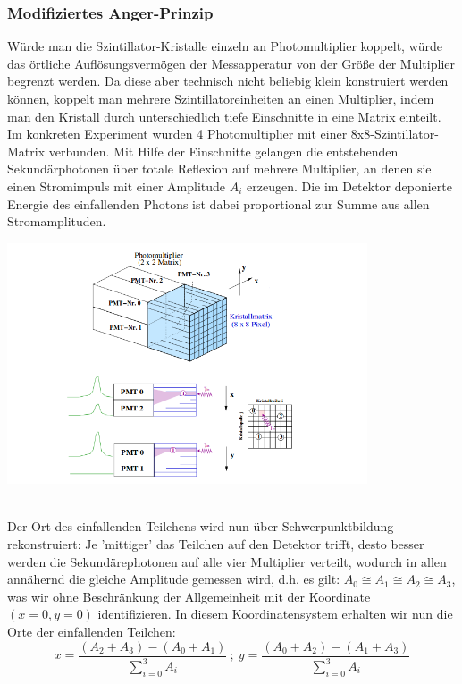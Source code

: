 		
\subsubsection{Modifiziertes Anger-Prinzip}
	Würde man die Szintillator-Kristalle einzeln an Photomultiplier koppelt, würde das örtliche Auflösungsvermögen der Messapperatur von der Größe der Multiplier begrenzt werden. Da diese aber technisch nicht beliebig klein konstruiert werden können, koppelt man mehrere Szintillatoreinheiten an einen Multiplier, indem man den Kristall durch unterschiedlich tiefe Einschnitte in eine Matrix einteilt. Im konkreten Experiment wurden 4 Photomultiplier mit einer 8x8-Szintillator-Matrix verbunden. Mit Hilfe der Einschnitte gelangen die entstehenden Sekundärphotonen über totale Reflexion auf mehrere Multiplier, an denen sie einen Stromimpuls mit einer Amplitude $A_i$ erzeugen. Die im Detektor deponierte Energie des einfallenden Photons ist dabei proportional zur Summe aus allen Stromamplituden. \\
	
	\minipanf
					\begin{center}
						\includegraphics[width=0.8\textwidth, height=0.3\textheight]{pic/anger-prinzip.png}
						\label{PET-Prinzip}
					\end{center}
					\hspace{2mm}
	\minipend\\
	Der Ort des einfallenden Teilchens wird nun über Schwerpunktbildung rekonstruiert: Je 'mittiger' das Teilchen auf den Detektor trifft, desto besser werden die Sekundärephotonen auf alle vier Multiplier verteilt, wodurch in allen annähernd die gleiche Amplitude gemessen wird, d.h. es gilt: $A_0 \cong A_1 \cong A_2 \cong A_3$, was wir ohne Beschränkung der Allgemeinheit mit der Koordinate $(x = 0, y = 0)$ identifizieren. In diesem Koordinatensystem erhalten wir nun die Orte der einfallenden Teilchen:
	\begin{equation*}
	x = \frac{(A_2+A_3)-(A_0+A_1)}{\sum_{i=0}^{3} A_i}\ ;\ y = \frac{(A_0+A_2)-(A_1+A_3)}{\sum_{i=0}^{3} A_i}
	\end{equation*}